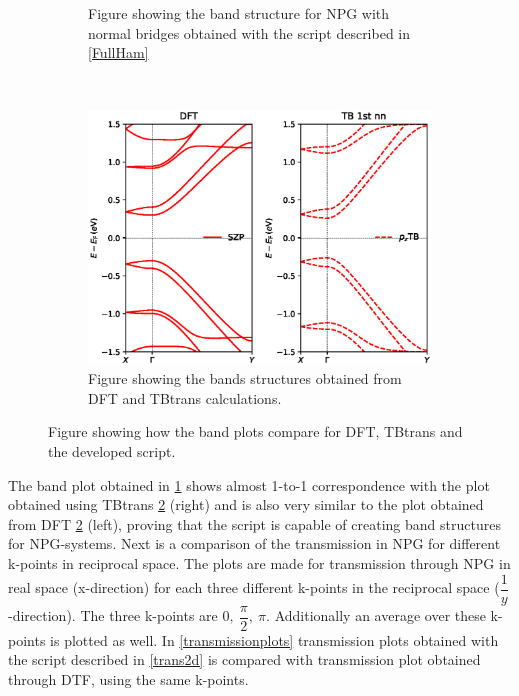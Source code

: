 \begin{figure}[H]
\begin{subfigure}[b]{0.5\textwidth}
		\caption{Figure showing the band structure for NPG with normal bridges obtained with the script described in \cref{FullHam}}
		\label{bsscript}
	\end{subfigure}
	~  %
	\begin{subfigure}[b]{0.5\textwidth}
		\includegraphics[width=\textwidth]{Figures/bands.eps}
		\caption{Figure showing the bands structures obtained from DFT and TBtrans calculations.}
		\label{bsdfttbt}
	\end{subfigure}
	\caption{Figure showing how the band plots compare for DFT, TBtrans and the developed script.}\label{bandcompare}
\end{figure}
The band plot obtained in \cref{bsscript} shows almost 1-to-1 correspondence with the plot obtained using TBtrans \cref{bsdfttbt} (right) and is also very similar to the plot obtained from DFT \cref{bsdfttbt} (left), proving that the script is capable of creating band structures for NPG-systems. Next is a comparison of the transmission in NPG for different k-points in reciprocal space. The plots are made for transmission through NPG in real space (x-direction) for each three different k-points in the reciprocal space (\(\dfrac{1}{y}\)-direction). The three k-points are \(0,\ \dfrac{\pi}{2},\ \pi\). Additionally an average over these k-points is plotted as well. In \cref{transmissionplots} transmission plots obtained with the script described in \cref{trans2d} is compared with transmission plot obtained through DTF, using the same k-points.
